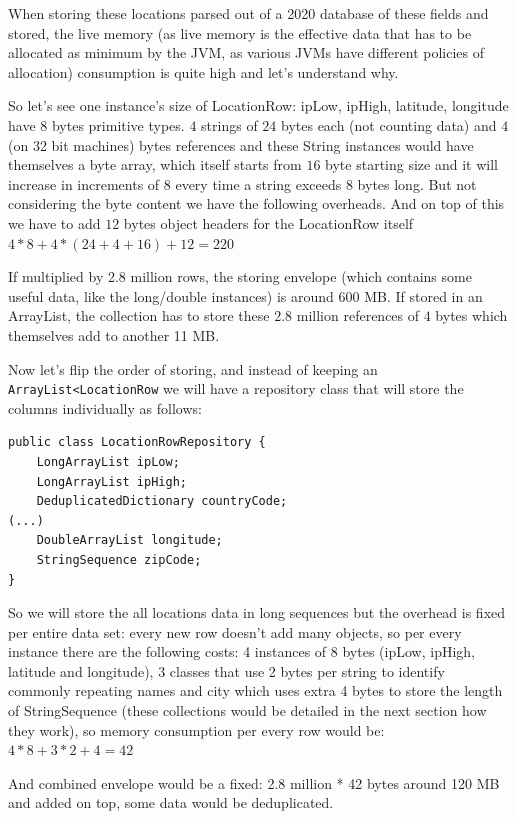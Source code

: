 \documentclass[a4paper,twoside]{article}
\begin{document}
When storing these locations parsed out of a 2020 database of these fields and stored, the live memory (as live memory is the effective data that has to be allocated as minimum by the JVM, as various JVMs have different policies of allocation) consumption is quite high and let's understand why.

So let's see one instance's size of LocationRow: ipLow, ipHigh, latitude, longitude have $8$ bytes primitive types. $4$ strings of $24$ bytes each (not counting data) and $4$ (on 32 bit machines) bytes references and these String instances would have themselves a byte array, which itself starts from $16$ byte starting size and it will increase in increments of 8 every time a string exceeds 8 bytes long. But not considering the byte content we have the following overheads. And on top of this we have to add $12$ bytes object headers for the LocationRow itself
$ 4 * 8 + 4 * (24 + 4 + 16) + 12 = 220$

If multiplied by 2.8 million rows, the storing envelope (which contains some useful data, like the long/double instances) is around 600 MB. If stored in an ArrayList, the collection has to store these $2.8$ million references of $4$ bytes which themselves add to another 11 MB.

Now let's flip the order of storing, and instead of keeping an {\texttt{ArrayList<LocationRow}} we will have a repository class that will store the columns individually as follows:

\begin{small}
	\begin{verbatim}
public class LocationRowRepository {
    LongArrayList ipLow;
    LongArrayList ipHigh;
    DeduplicatedDictionary countryCode;
(...)
    DoubleArrayList longitude;
    StringSequence zipCode;
}
\end{verbatim}
\end{small}

So we will store the all locations data in long sequences but the overhead is fixed per entire data set: every new row doesn't add many objects, so per every instance there are the following costs:
4 instances of 8 bytes (ipLow, ipHigh, latitude and longitude), 3 classes that use 2 bytes per string to identify commonly repeating names and city which uses extra 4 bytes to store the length of StringSequence (these collections would be detailed in the next section how they work), so memory consumption per every row would be: $4 * 8 + 3 * 2 + 4 = 42$

And combined envelope would be a fixed: 2.8 million * 42 bytes around 120 MB and added on top, some data would be deduplicated.
\end{document}
